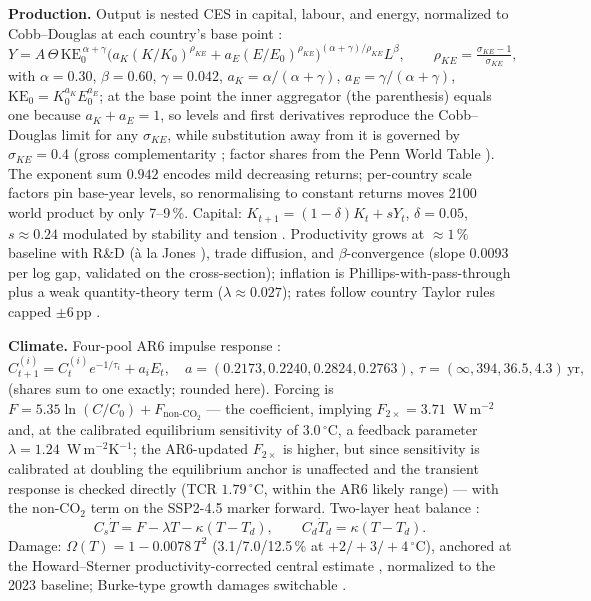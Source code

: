 \documentclass[a4paper,fleqn]{cas-sc}
\begin{document}
\textbf{Production.} Output is nested CES in capital, labour, and energy, normalized to
Cobb--Douglas at each country's base point \citep{arrow1961}:
\begin{equation}
Y = A\,\Theta\,\mathrm{KE}_0^{\,\alpha+\gamma}\big(a_K (K/K_0)^{\rho_{KE}} + a_E (E/E_0)^{\rho_{KE}}\big)^{(\alpha+\gamma)/\rho_{KE}} L^{\beta},
\qquad \rho_{KE} = \tfrac{\sigma_{KE}-1}{\sigma_{KE}},
\label{eq:ces}
\end{equation}
with $\alpha=0.30$, $\beta=0.60$, $\gamma=0.042$, $a_K=\alpha/(\alpha+\gamma)$,
$a_E=\gamma/(\alpha+\gamma)$, $\mathrm{KE}_0=K_0^{a_K}E_0^{a_E}$; at the base point the inner
aggregator (the parenthesis) equals one because $a_K+a_E=1$, so levels and first derivatives
reproduce the Cobb--Douglas limit for any $\sigma_{KE}$, while substitution away from it is
governed by $\sigma_{KE}=0.4$ (gross complementarity \cite{vanderwerf2008,koetse2008};
factor shares from the Penn World Table \cite{feenstra2015,gollin2002}). The exponent sum $0.942$ encodes mild
decreasing returns; per-country scale factors pin base-year levels, so renormalising to
constant returns moves 2100 world product by only 7--9\,\%. Capital:
$K_{t+1}=(1-\delta)K_t+sY_t$, $\delta=0.05$, $s\approx0.24$ modulated by stability and tension
\citep{mody2012}. Productivity grows at ${\approx}1\,\%$ baseline with R\&D
(\`a la Jones \cite{jones1995}), trade diffusion, and $\beta$-convergence (slope 0.0093 per
log gap, validated on the cross-section); inflation is Phillips-with-pass-through plus a weak
quantity-theory term ($\lambda\approx0.027$); rates follow country Taylor rules capped
$\pm6$\,pp \citep{taylor1993}.

\textbf{Climate.} Four-pool AR6 impulse response \citep{joos2013}:
\begin{equation}
C^{(i)}_{t+1} = C^{(i)}_t e^{-1/\tau_i} + a_i E_t,\quad
a=(0.2173,0.2240,0.2824,0.2763),\ \tau=(\infty,394,36.5,4.3)\,\text{yr},
\label{eq:pools}
\end{equation}
(shares sum to one exactly; rounded here). Forcing is
$F=5.35\ln(C/C_0)+F_{\text{non-CO}_2}$ --- the \citet{myhre1998} coefficient, implying
$F_{2\times}=3.71$~W\,m$^{-2}$ and, at the calibrated equilibrium sensitivity of
$3.0\,^{\circ}$C, a feedback parameter $\lambda=1.24$~W\,m$^{-2}$K$^{-1}$; the AR6-updated
$F_{2\times}$ is higher, but since sensitivity is calibrated at doubling the equilibrium anchor
is unaffected and the transient response is checked directly (TCR $1.79\,^{\circ}$C, within the
AR6 likely range) --- with the non-CO$_2$ term on the SSP2-4.5 marker forward. Two-layer heat
balance \citep{geoffroy2013}:
\begin{equation}
C_s\dot T = F - \lambda T - \kappa(T-T_d), \qquad C_d\dot T_d = \kappa(T-T_d).
\label{eq:ebm}
\end{equation}
Damage: $\Omega(T)=1-0.0078\,T^2$ (3.1/7.0/12.5\,\% at $+2/+3/+4\,^{\circ}$C), anchored at the
Howard--Sterner productivity-corrected central estimate \citep{howard2017,nordhaus2017},
normalized to the 2023 baseline; Burke-type growth damages switchable
\citep{burke2015,burke2023}.
\end{document}
